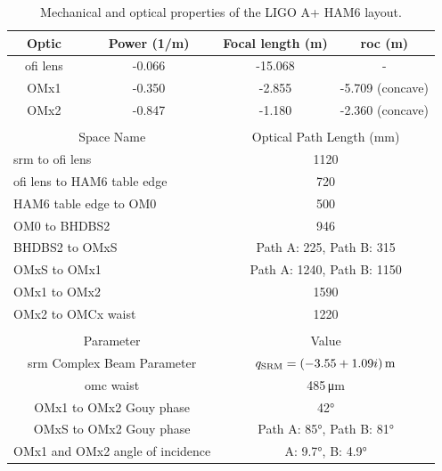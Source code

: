 \begin{table}
	\centering
	\begin{tabular}{| c | c | c | c | }
		\hline 
		Optic & Power (1/m) & Focal length (m) & \gls{roc} (m) \\
		\hline 
		\gls{ofi} lens & -0.066 & -15.068 & -\\
		OMx1 & -0.350 & -2.855 & -5.709 (concave)\\
		OMx2 & -0.847 & -1.180 & -2.360 (concave)\\
		\hline
		\multicolumn{4}{c}{}\\
		\hline
		\multicolumn{2}{|c|}{Space Name} & \multicolumn{2}{|c|}{Optical Path Length (mm)}\\
		\hline
		\multicolumn{2}{|l|}{\gls{srm} to \gls{ofi} lens} & \multicolumn{2}{|c|}{1120}\\
		\multicolumn{2}{|l|}{\gls{ofi} lens to HAM6 table edge} & \multicolumn{2}{|c|}{720}\\
		\multicolumn{2}{|l|}{HAM6 table edge to OM0} & \multicolumn{2}{|c|}{500}\\
		\multicolumn{2}{|l|}{OM0 to BHDBS2} & \multicolumn{2}{|c|}{946}\\
		\multicolumn{2}{|l|}{BHDBS2 to OMxS} & \multicolumn{2}{|c|}{Path A: 225, Path B: 315}\\
		\multicolumn{2}{|l|}{OMxS to OMx1} & \multicolumn{2}{|c|}{Path A: 1240, Path B: 1150}\\
		\multicolumn{2}{|l|}{OMx1 to OMx2} & \multicolumn{2}{|c|}{1590}\\
		\multicolumn{2}{|l|}{OMx2 to OMCx waist} & \multicolumn{2}{|c|}{1220}\\
		\hline
		\multicolumn{4}{c}{}\\
		\hline
		\multicolumn{2}{|c|}{Parameter} & \multicolumn{2}{|c|}{Value}\\
		\hline
		\multicolumn{2}{|c|}{\gls{srm} Complex Beam Parameter} & \multicolumn{2}{|c|}{$q_{\rm{SRM}} = (-3.55 + 1.09i)\,\rm{m} $}\\
		\multicolumn{2}{|c|}{\gls{omc} waist} & \multicolumn{2}{|c|}{485\,\si{\micro\meter}}\\
		\multicolumn{2}{|c|}{OMx1 to OMx2 Gouy phase} & \multicolumn{2}{|c|}{\ang{42}}\\
		\multicolumn{2}{|c|}{OMxS to OMx2 Gouy phase} & \multicolumn{2}{|c|}{Path A: \ang{85}, Path B: \ang{81}}\\
		\multicolumn{2}{|c|}{OMx1 and OMx2 angle of incidence} & \multicolumn{2}{|c|}{A: \ang{9.7}, B: \ang{4.9}}\\
		\hline
	\end{tabular}
	\caption[Mechanical and optical properties of the LIGO A+ HAM6 layout.]{Mechanical and optical properties of the LIGO A+ HAM6 layout.}
	\label{tab:layout_parameters}
\end{table}
